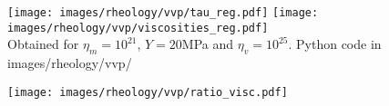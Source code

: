 \begin{center}
\texttt{[image: images/rheology/vvp/tau\_reg.pdf]}
\texttt{[image: images/rheology/vvp/viscosities\_reg.pdf]}\\
{\captionfont Obtained for $\eta_m=10^{21}$, $Y=20$MPa and $\eta_v=10^{25}$. Python code 
in images/rheology/vvp/}
\end{center}


\texttt{[image: images/rheology/vvp/ratio\_visc.pdf]}



%










